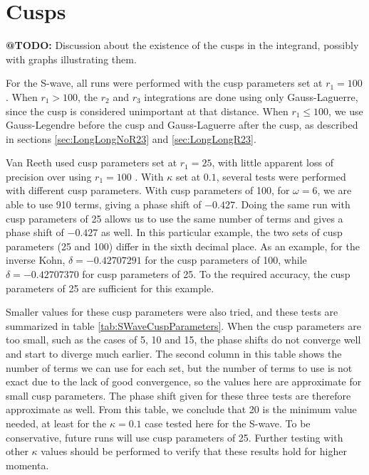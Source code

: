 \documentclass[Dissertation.tex]{subfiles}
\begin{document}
\section{Cusps}
\textbf{@TODO:} Discussion about the existence of the cusps in the integrand, possibly with graphs illustrating them.

For the S-wave, all runs were performed with the cusp parameters set at $r_1 = 100$. When $r_1 > 100$, the $r_2$ and $r_3$ integrations are done using only Gauss-Laguerre, since the cusp is considered unimportant at that distance. When $r_1 \leq 100$, we use Gauss-Legendre before the cusp and Gauss-Laguerre after the cusp, as described in sections \ref{sec:LongLongNoR23} and \ref{sec:LongLongR23}. 

Van Reeth used cusp parameters set at $r_1 = 25$, with little apparent loss of precision over using $r_1 = 100$ \cite{}. With $\kappa$ set at $0.1$, several tests were performed with different cusp parameters. With cusp parameters of 100, for $\omega = 6$, we are able to use 910 terms, giving a phase shift of $-0.427$. Doing the same run with cusp parameters of 25 allows us to use the same number of terms and gives a phase shift of $-0.427$ as well. In this particular example, the two sets of cusp parameters (25 and 100) differ in the sixth decimal place. As an example, for the inverse Kohn, $\delta = -0.42707291$ for the cusp parameters of 100, while $\delta = -0.42707370$ for cusp parameters of 25. To the required accuracy, the cusp parameters of 25 are sufficient for this example.

Smaller values for these cusp parameters were also tried, and these tests are summarized in table \ref{tab:SWaveCuspParameters}. When the cusp parameters are too small, such as the cases of 5, 10 and 15, the phase shifts do not converge well and start to diverge much earlier. The second column in this table shows the number of terms we can use for each set, but the number of terms to use is not exact due to the lack of good convergence, so the values here are approximate for small cusp parameters. The phase shift given for these three tests are therefore approximate as well. From this table, we conclude that 20 is the minimum value needed, at least for the $\kappa = 0.1$ case tested here for the S-wave. To be conservative, future runs will use cusp parameters of 25. Further testing with other $\kappa$ values should be performed to verify that these results hold for higher momenta.
\end{document}
